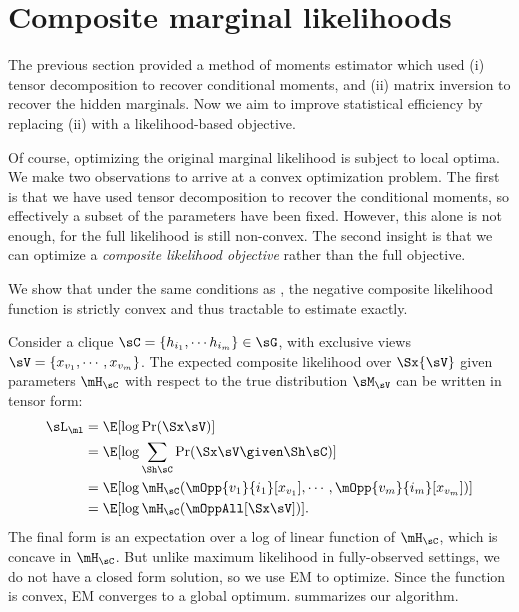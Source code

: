 \section{Composite marginal likelihoods}
\label{sec:piecewise}

The previous section provided a method of moments estimator
which used (i) tensor decomposition to recover conditional moments,
and (ii) matrix inversion to recover the hidden marginals.
Now we aim to improve statistical efficiency by replacing (ii) with a likelihood-based objective.

Of course, optimizing the original marginal likelihood is subject to local optima.
We make two observations to arrive at a convex optimization problem.
The first is that we have used tensor decomposition to recover the conditional moments,
so effectively a subset of the parameters have been fixed.
However, this alone is not enough, for the full likelihood is still non-convex.
The second insight is that we can optimize a \emph{composite likelihood objective} \cite{lindsay88composite}
rather than the full objective.

We show that under the same conditions as , the
  negative composite likelihood function is strictly convex and thus
  tractable to estimate exactly.

Consider a clique $\sC = \{h_{i_1}, \cdots h_{i_m}\} \in \sG$, with
  exclusive views $\sV = \{x_{v_1}, \cdots, x_{v_m}\}$. 
The expected composite likelihood over $\Sx{\sV}$ given parameters $\mH_\sC$
with respect to the true distribution $\sM_\sV$ can be written in tensor form:
\begin{align}
  \sL_\ml %
  &= \E[\log \Pr( \Sx \sV )] \nonumber \\
  &= \E[\log \sum_{\Sh \sC} \Pr( \Sx \sV \given \Sh \sC )] \nonumber \\
  &= \E[\log \mH_\sC(\mOpp{v_1}{i_1} [x_{v_1}], \cdots, \mOpp{v_m}{i_m} [x_{v_m}])] \nonumber \\
  &= \E[\log \mH_\sC(\mOppAll[\Sx\sV])]. \label{eqn:piecewise-obj}
\end{align}
The final form is an expectation over a log of linear function of $\mH_\sC$, which is concave in
$\mH_\sC$.  But unlike maximum likelihood in fully-observed settings,
we do not have a closed form solution, so we use EM to optimize.
Since the function is convex, EM converges to a global optimum.
 summarizes our algorithm.

